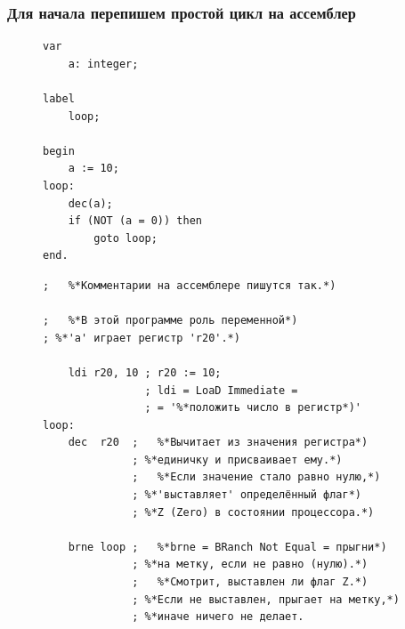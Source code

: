\documentclass[aspectratio=169, pdf, 8pt, unicode]{beamer}
\begin{document}
\begin{frame}[fragile]
\frametitle{Для начала перепишем простой цикл на ассемблер}
	\begin{figure}[!htb]
		\centering
		\begin{minipage}{.35\textwidth}
			\begin{lstlisting}
var
    a: integer;

label
    loop;

begin
    a := 10;
loop:
    dec(a);
    if (NOT (a = 0)) then
        goto loop;
end.
			\end{lstlisting}
		\end{minipage}
		\begin{minipage}{.55\textwidth}
			\centering
			\begin{lstlisting}
;   %*Комментарии на ассемблере пишутся так.*)

;   %*В этой программе роль переменной*)
; %*'a' играет регистр 'r20'.*)

    ldi r20, 10 ; r20 := 10;
                ; ldi = LoaD Immediate =
                ; = '%*положить число в регистр*)'
loop:
    dec  r20  ;   %*Вычитает из значения регистра*)
              ; %*единичку и присваивает ему.*)
              ;   %*Если значение стало равно нулю,*)
              ; %*'выставляет' определённый флаг*)
              ; %*Z (Zero) в состоянии процессора.*)

    brne loop ;   %*brne = BRanch Not Equal = прыгни*)
              ; %*на метку, если не равно (нулю).*)
              ;   %*Смотрит, выставлен ли флаг Z.*)
              ; %*Если не выставлен, прыгает на метку,*)
              ; %*иначе ничего не делает.
			\end{lstlisting}
		\end{minipage}
	\end{figure}
\end{frame}
\end{document}
